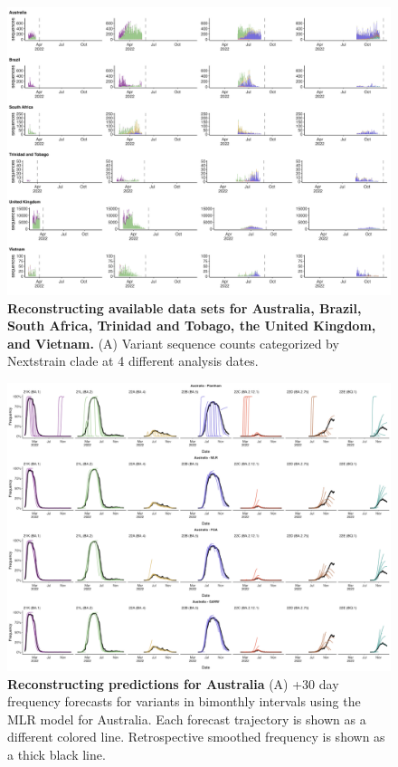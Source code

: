 \documentclass[11pt,oneside,letterpaper]{article}
\begin{document}



\newpage

\setcounter{figure}{0}
\setcounter{table}{0}
\renewcommand{\thefigure}{S\arabic{figure}}
\renewcommand{\thetable}{S\arabic{table}}




\begin{figure}[tb!]
	\centering
	\includegraphics[width=0.9\textwidth=0.01]{supp_figures/Supplementary_Fig_1A.png}
	\caption{
		\textbf{Reconstructing available data sets for Australia, Brazil, South Africa, Trinidad and Tobago, the United Kingdom, and Vietnam.}
		(A) Variant sequence counts categorized by Nextstrain clade at 4 different analysis dates. 
	}
	\label{fig:Supplementary_Fig_1A}
\end{figure}


\begin{figure}[tb!]
	\centering
	\includegraphics[width=0.9\textwidth=0.01]{supp_figures/supplementary_fig_Australia.png}
	\caption{
		\textbf{Reconstructing predictions for Australia}
		(A) +30 day frequency forecasts for variants in bimonthly intervals using the MLR model for Australia.
		Each forecast trajectory is shown as a different colored line.
		Retrospective smoothed frequency is shown as a thick black line.
	}
	\label{fig:supplementary_fig_Australia}
\end{figure}
\end{document}
